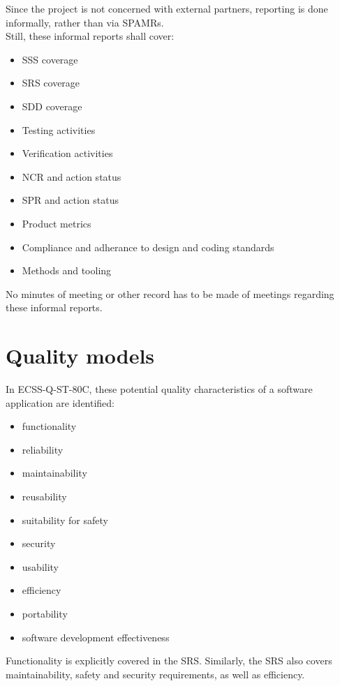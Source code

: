 Since the project is not concerned with external partners, reporting is done
informally, rather than via \glspl{SPAMR}.\\

\noindent
Still, these informal reports shall cover:

\begin{itemize}
	\item \gls{SSS} coverage
	\item \gls{SRS} coverage
	\item \gls{SDD} coverage
	\item Testing activities
	\item Verification activities
	\item \gls{NCR} and action status
	\item \gls{SPR} and action status
	\item Product metrics
	\item Compliance and adherance to design and coding standards
	\item Methods and tooling
\end{itemize}

\noindent
No minutes of meeting or other record has to be made of meetings regarding
these informal reports.


\section{Quality models}

In ECSS-Q-ST-80C\cite{ECSS80C}, these potential quality characteristics of a
software application are identified:

\begin{multicols}{2}
\begin{itemize}
	\item functionality
	\item reliability
	\item maintainability
	\item reusability
	\item suitability for safety
	\item security
	\item usability
	\item efficiency
	\item portability
	\item software development effectiveness
\end{itemize}
\end{multicols}

\noindent
Functionality is explicitly covered in the \gls{SRS}\cite{flightosSRS}. Similarly,
the \gls{SRS} also covers maintainability, safety and security requirements, as
well as efficiency.\\

